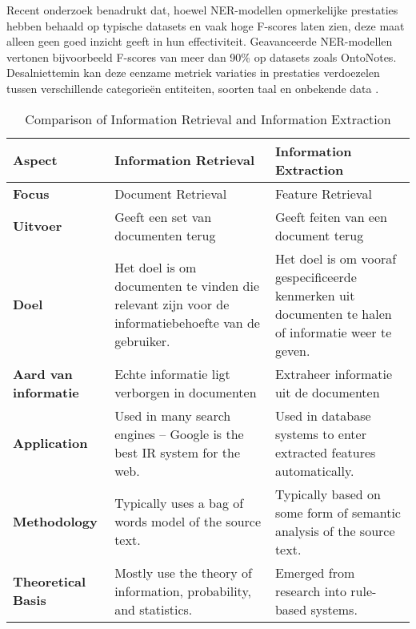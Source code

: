 \begin{itemize}
    Recent onderzoek benadrukt dat, hoewel NER-modellen opmerkelijke prestaties hebben behaald op typische datasets en vaak hoge F-scores laten zien, deze maat alleen geen goed inzicht geeft in hun effectiviteit. Geavanceerde NER-modellen vertonen bijvoorbeeld F-scores van meer dan 90\% op datasets zoals OntoNotes. Desalniettemin kan deze eenzame metriek variaties in prestaties verdoezelen tussen verschillende categorieën entiteiten, soorten taal en onbekende data \autocite{vajjala2022reallyknowstateart}.
    
\end{itemize}


\begin{table}[h!]
  \centering
  \begin{tabular}{|p{4cm}|p{5cm}|p{5cm}|}
  \hline
  \textbf{Aspect} & \textbf{Information Retrieval} & \textbf{Information Extraction} \\ \hline
  \textbf{Focus} & Document Retrieval & Feature Retrieval \\ \hline
  \textbf{Uitvoer} & Geeft een set van documenten terug & Geeft feiten van een document terug \\ \hline
  \textbf{Doel} & Het doel is om documenten te vinden die relevant zijn voor de informatiebehoefte van de gebruiker. & Het doel is om vooraf gespecificeerde kenmerken uit documenten te halen of informatie weer te geven. \\ \hline
  \textbf{Aard van informatie} & Echte informatie ligt verborgen in documenten & Extraheer informatie uit de documenten \\ \hline
  \textbf{Application} & Used in many search engines – Google is the best IR system for the web. & Used in database systems to enter extracted features automatically. \\ \hline
  \textbf{Methodology} & Typically uses a bag of words model of the source text. & Typically based on some form of semantic analysis of the source text. \\ \hline
  \textbf{Theoretical Basis} & Mostly use the theory of information, probability, and statistics. & Emerged from research into rule-based systems. \\ \hline
  \end{tabular}
  \caption{Comparison of Information Retrieval and Information Extraction}
  \label{tab:ir_vs_ie}
  \end{table}
  
